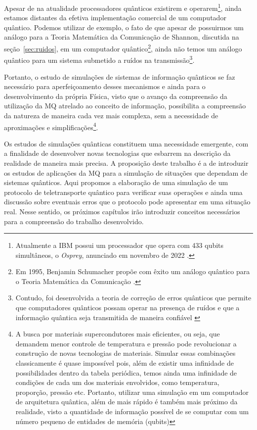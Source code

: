 Apesar de na atualidade processadores quânticos existirem e operarem\footnote{Atualmente a IBM possui um processador que opera com 433 qubits simultâneos, o \textit{Osprey}, anunciado em novembro de 2022 \cite{osprey}.}, ainda estamos distantes da efetiva implementação comercial de um computador quântico. Podemos utilizar de exemplo, o fato de que apesar de possuirmos um análogo para a Teoria Matemática da Comunicação de Shannon, discutida na seção~\ref{sec:ruidos}, em um computador quântico\footnote{Em 1995, Benjamin Schumacher propõe com êxito um análogo quântico para o Teoria Matemática da Comunicação \cite{benschu}.}, ainda não temos um análogo quântico para um sistema submetido a ruídos na transmissão\footnote{Contudo, foi desenvolvida a teoria de correção de erros quânticos que permite que computadores quânticos possam operar na presença de ruídos e que a informação quântica seja transmitida de maneira confiável \cite{chuang}}\cite{chuang}.

Portanto, o estudo de simulações de sistemas de informação quânticos se faz necessário para aperfeiçoamento desses mecanismos e ainda para o desenvolvimento da própria Física, visto que o avanço da compreensão da utilização da MQ atrelado ao conceito de informação, possibilita a compreensão da natureza de maneira cada vez mais complexa, sem a necessidade de aproximações e simplificações\footnote{A busca por materiais supercondutores mais eficientes, ou seja, que demandem menor controle de temperatura e pressão pode revolucionar a construção de novas tecnologias de materiais. Simular essas combinações classicamente é quase impossível pois, além de existir uma infinidade de possibilidades dentro da tabela periódica, temos ainda uma infinidade de condições de cada um dos materiais envolvidos, como temperatura, proporção, pressão etc. Portanto, utilizar uma simulação em um computador de arquitetura quântica, além de mais rápido é também mais próximo da realidade, visto a quantidade de informação possível de se computar com um número pequeno de entidades de memória (qubits)\cite{videoyoutube}}\cite{videoyoutube}.

Os estudos de simulações quânticas constituem uma necessidade emergente, com a finalidade de desenvolver novas tecnologias que esbarrem na descrição da realidade de maneira mais precisa. A proposição deste trabalho é a de introduzir os estudos de aplicações da MQ para a simulação de situações que dependam de sistemas quânticos. Aqui propomos a elaboração de uma simulação de um protocolo de teletransporte quântico para verificar suas operações e ainda uma discussão sobre eventuais erros que o protocolo pode apresentar em uma situação real. Nesse sentido, os próximos capítulos irão introduzir conceitos necessários para a compreensão do trabalho desenvolvido.
